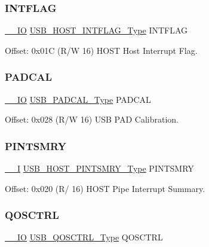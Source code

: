 \subsubsection{\texorpdfstring{INTFLAG}{INTFLAG}}
{\footnotesize\ttfamily \mbox{\hyperlink{core__cm0plus_8h_aec43007d9998a0a0e01faede4133d6be}{\+\_\+\+\_\+\+IO}} \mbox{\hyperlink{union_u_s_b___h_o_s_t___i_n_t_f_l_a_g___type}{U\+S\+B\+\_\+\+H\+O\+S\+T\+\_\+\+I\+N\+T\+F\+L\+A\+G\+\_\+\+Type}} I\+N\+T\+F\+L\+AG}



Offset\+: 0x01C (R/W 16) H\+O\+ST Host Interrupt Flag. 

\mbox{\label{struct_usb_host_a446e7b83e50d200ac238425577a31e5a}} 
\subsubsection{\texorpdfstring{PADCAL}{PADCAL}}
{\footnotesize\ttfamily \mbox{\hyperlink{core__cm0plus_8h_aec43007d9998a0a0e01faede4133d6be}{\+\_\+\+\_\+\+IO}} \mbox{\hyperlink{union_u_s_b___p_a_d_c_a_l___type}{U\+S\+B\+\_\+\+P\+A\+D\+C\+A\+L\+\_\+\+Type}} P\+A\+D\+C\+AL}



Offset\+: 0x028 (R/W 16) U\+SB P\+AD Calibration. 

\mbox{\label{struct_usb_host_aaa834c6a6fd2e59e91fcf7571fe92b0d}} 
\subsubsection{\texorpdfstring{PINTSMRY}{PINTSMRY}}
{\footnotesize\ttfamily \mbox{\hyperlink{core__cm0plus_8h_af63697ed9952cc71e1225efe205f6cd3}{\+\_\+\+\_\+I}} \mbox{\hyperlink{union_u_s_b___h_o_s_t___p_i_n_t_s_m_r_y___type}{U\+S\+B\+\_\+\+H\+O\+S\+T\+\_\+\+P\+I\+N\+T\+S\+M\+R\+Y\+\_\+\+Type}} P\+I\+N\+T\+S\+M\+RY}



Offset\+: 0x020 (R/ 16) H\+O\+ST Pipe Interrupt Summary. 

\mbox{\label{struct_usb_host_a9df8751b364843c227b690917f10a4b4}} 
\subsubsection{\texorpdfstring{QOSCTRL}{QOSCTRL}}
{\footnotesize\ttfamily \mbox{\hyperlink{core__cm0plus_8h_aec43007d9998a0a0e01faede4133d6be}{\+\_\+\+\_\+\+IO}} \mbox{\hyperlink{union_u_s_b___q_o_s_c_t_r_l___type}{U\+S\+B\+\_\+\+Q\+O\+S\+C\+T\+R\+L\+\_\+\+Type}} Q\+O\+S\+C\+T\+RL}



